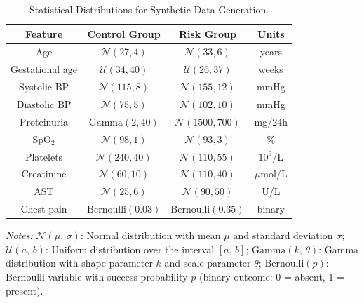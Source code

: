 \documentclass[diagnostics,article,submit,pdftex,moreauthors]{Definitions/mdpi}
\begin{document}


\begin{table}[H]
  \small
  \centering
  \caption{Statistical Distributions for Synthetic Data Generation.\label{tab:distributions}}
\begin{tabularx}{\textwidth}{CCCC}%
\toprule
\textbf{Feature} & \textbf{Control Group} & \textbf{Risk Group} & \textbf{Units} \\
\midrule
Age & $\mathcal{N}(27, 4)$ & $\mathcal{N}(33, 6)$ & years \\
Gestational age & $\mathcal{U}(34, 40)$ & $\mathcal{U}(26, 37)$ & weeks \\
Systolic BP & $\mathcal{N}(115, 8)$ & $\mathcal{N}(155, 12)$ & mmHg \\
Diastolic BP & $\mathcal{N}(75, 5)$ & $\mathcal{N}(102, 10)$ & mmHg \\
Proteinuria & $\text{Gamma}(2, 40)$ & $\mathcal{N}(1500, 700)$ & mg/24h \\
SpO$_2$ & $\mathcal{N}(98, 1)$ & $\mathcal{N}(93, 3)$ & \% \\
Platelets & $\mathcal{N}(240, 40)$ & $\mathcal{N}(110, 55)$ & $10^9$/L \\
Creatinine & $\mathcal{N}(60, 10)$ & $\mathcal{N}(110, 40)$ & $\mu$mol/L \\
AST & $\mathcal{N}(25, 6)$ & $\mathcal{N}(90, 50)$ & U/L \\
Chest pain & $\text{Bernoulli}(0.03)$ & $\text{Bernoulli}(0.35)$ & binary \\
\bottomrule
\end{tabularx}
\noindent\footnotesize\textit{Notes:}
$\mathcal{N}(\mu,\,\sigma)$: Normal distribution with mean $\mu$ and standard
deviation $\sigma$;
$\mathcal{U}(a,\,b)$: Uniform distribution over the interval $[a,\,b]$;
$\mathrm{Gamma}(k,\,\theta)$: Gamma distribution with shape parameter $k$ and
scale parameter $\theta$;
$\mathrm{Bernoulli}(p)$: Bernoulli variable with success probability $p$ (binary
outcome: 0 = absent, 1 = present).
\end{table}
\end{document}
